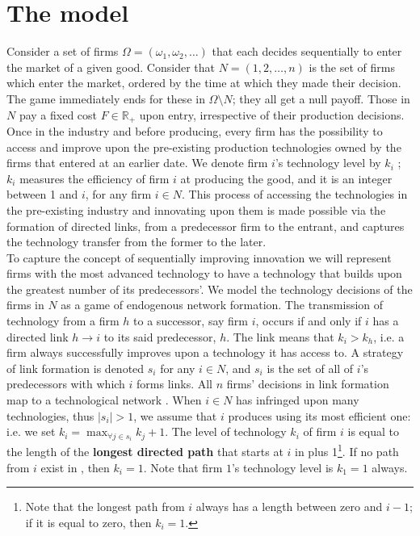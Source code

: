 \documentclass{article}
\begin{document}
\section{The model}
\indent Consider a set of firms $\Omega=(\omega_1,\omega_2,\ldots)$ that each decides sequentially to enter the market of a given good. 
Consider that $N=(1,2,\ldots,n)$ is the set of firms which enter the market, ordered by the time at which they made their decision. The game immediately ends for these in $\Omega\setminus N$; they all get a null payoff. Those in $N$ pay a fixed cost $F\in \mathbb{R}_+$ upon entry, irrespective of their production decisions. Once in the industry and before producing, every firm has the possibility to access and improve upon the pre-existing production technologies owned by the firms that entered at an earlier date. We denote firm $i$'s technology level by $k_i$ ; $k_i$ measures the efficiency of firm $i$ at producing the good, and it is an integer between 1 and $i$, for any firm $i\in N$. This process of accessing the technologies in the pre-existing industry and innovating upon them is made possible via the formation of directed links, from a predecessor firm to the entrant, and captures the technology transfer from the former to the later. \\
\indent To capture the concept of sequentially improving innovation we will represent firms with the most advanced technology to have a technology that builds upon the greatest number of its predecessors'. We model the technology decisions of the firms in $N$ as a game of endogenous network formation. The transmission of technology from a firm $h$ to a successor, say firm $i$, occurs if and only if $i$ has a directed link $h\rightarrow i$ to its said predecessor, $h$. The link means that $k_i>k_h$, i.e. a firm always successfully improves upon a technology it has access to. A strategy of link formation is denoted $s_i$ for any $i\in N$, and $s_i$ is the set of all of $i$'s predecessors with which $i$ forms links. All $n$ firms' decisions in link formation map to a technological network . When $i\in N$ has infringed upon many technologies, thus $|s_i|>1$, we assume that $i$ produces using its most efficient one: i.e. we set $k_i=\max_{\forall j\in s_i} k_j+1$. The level of technology $k_i$ of firm $i$ is equal to the length of the \textbf{longest directed path} that starts at $i$ in  plus 1\footnote{Note that the longest path from $i$ always has a length between zero and $i-1$; if it is equal to zero, then $k_i=1$.}. If no path from $i$ exist in , then $k_i=1$. Note that firm $1$'s technology level is $k_1=1$ always. \\
\end{document}
